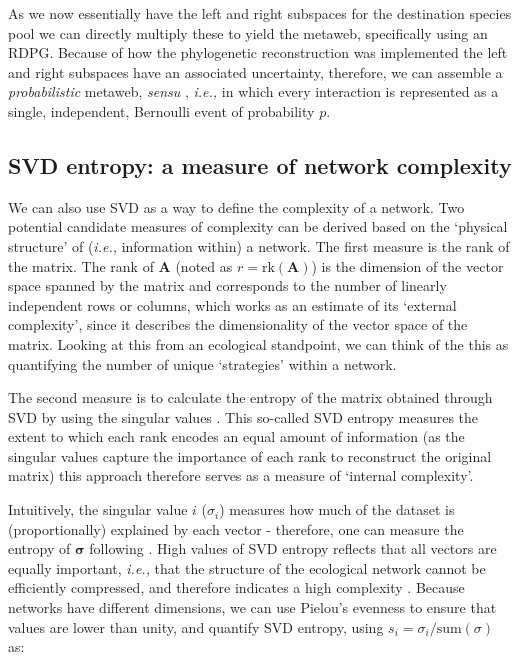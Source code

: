 As we now essentially have the left and right subspaces for the destination species pool we can directly multiply these to yield the metaweb, specifically using an RDPG. Because of how the phylogenetic reconstruction was implemented the left and right subspaces have an associated uncertainty, therefore, we can assemble a \emph{probabilistic} metaweb, \emph{sensu} \cite{Poisot2016StrPro}, \emph{i.e.,} in which every interaction is represented as a single, independent, Bernoulli event of probability \(p\).

\subsection{SVD entropy: a measure of network
complexity}\label{svd-entropy-a-measure-of-network-complexity}

We can also use SVD as a way to define the complexity of a network. Two potential candidate measures of complexity can be derived based on the `physical structure' of (\emph{i.e.,} information within) a network. The first measure is the rank of the matrix. The rank of $\mathbf{A}$ (noted as $r = \text{rk}(\mathbf{A})$) is the dimension of the vector space spanned by the matrix and corresponds to the number of linearly independent rows or columns, which works as an estimate of its `external complexity', since it describes the dimensionality of the vector space of the matrix. Looking at this from an ecological standpoint, we can think of the this as quantifying the number of unique `strategies' within a network.

The second measure is to calculate the entropy of the matrix obtained through SVD by using the singular values \cite{Shannon1948MatThe}. This so-called SVD entropy measures the extent to which each rank encodes an equal amount of information (as the singular values capture the importance of each rank to reconstruct the original matrix) this approach therefore serves as a measure of `internal complexity'.

Intuitively, the singular value $i$ ($\sigma_i$) measures how much of the dataset is (proportionally) explained by each vector - therefore, one can measure the entropy of \(\mathbf{\sigma}\) following \cite{Shannon1948MatThe}. High values of SVD entropy reflects that all vectors are equally important, \emph{i.e.,} that the structure of the ecological network cannot be efficiently compressed, and therefore indicates a high complexity \cite{Gu2016HowLon}. Because networks have different dimensions, we can use Pielou's evenness \cite{Pielou1975EcoDiv} to ensure that values are lower than unity, and quantify SVD entropy, using $s_i = \sigma_i/\text{sum}(\sigma)$ as:

